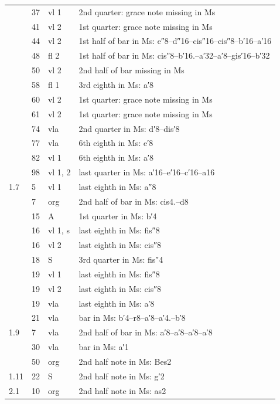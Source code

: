 \documentclass[parskip=full]{scrreprt}
\begin{document}
\begin{longtable}{lll L{10cm}}
       & 37  & vl 1    & 2nd quarter: grace note missing in Ms \\
       & 41  & vl 2    & 1st quarter: grace note missing in Ms \\
       & 44  & vl 2    & 1st half of bar in Ms: e″8–d″16–cis″16–cis″8–b′16–a′16 \\
       & 48  & fl 2    & 1st half of bar in Ms: cis″8–b′16.–a′32–a′8–gis′16–b′32 \\
       & 50  & vl 2    & 2nd half of bar missing in Ms \\
       & 58  & fl 1    & 3rd eighth in Ms: a′8 \\
       & 60  & vl 2    & 1st quarter: grace note missing in Ms \\
       & 61  & vl 2    & 1st quarter: grace note missing in Ms \\
       & 74  & vla     & 2nd quarter in Ms: d′8–dis′8 \\
       & 77  & vla     & 6th eighth in Ms: e′8 \\
       & 82  & vl 1    & 6th eighth in Ms: a′8 \\
       & 98  & vl 1, 2 & last quarter in Ms: a′16–e′16–c′16–a16 \\
  1.7  & 5   & vl 1    & last eighth in Ms: a″8 \\
       &  7  & org     & 2nd half of bar in Ms: cis4.–d8 \\
       & 15  & A       & 1st quarter in Ms: b′4 \\
       & 16  & vl 1, s & last eighth in Ms: fis″8 \\
       & 16  & vl 2    & last eighth in Ms: cis″8 \\
       & 18  & S       & 3rd quarter in Ms: fis″4 \\
       & 19  & vl 1    & last eighth in Ms: fis″8 \\
       & 19  & vl 2    & last eighth in Ms: cis″8 \\
       & 19  & vla     & last eighth in Ms: a′8 \\
       & 21  & vla     & bar in Ms: b′4–r8–a′8–a′4.–b′8 \\
  1.9  & 7   & vla     & 2nd half of bar in Ms: a′8–a′8–a′8–a′8 \\
       & 30  & vla     & bar in Ms: a′1 \\
       & 50  & org     & 2nd half note in Ms: Bes2 \\
  1.11 & 22  & S       & 2nd half note in Ms: g′2 \\
  2.1  & 10  & org     & 2nd half note in Ms: as2 \\

\end{longtable}
\end{document}

